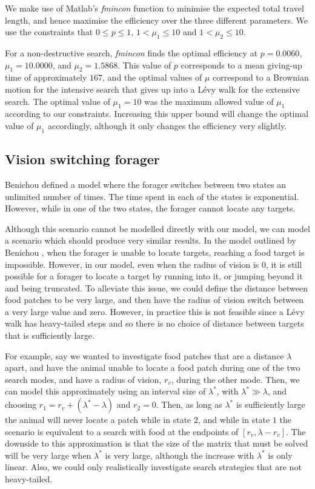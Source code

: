 We make use of Matlab's \emph{fmincon} function to minimise the expected total travel length, and hence maximise the efficiency over the three different parameters. We use the constraints that $0 \leq p \leq 1$, $1 < \mu_1 \leq 10$ and $1 < \mu_2 \leq 10$. 

For a non-destructive search, \emph{fmincon} finds the optimal efficiency at $p=0.0060$, $\mu_1 = 10.0000$, and $\mu_2 = 1.5868$. This value of $p$ corresponds to a mean giving-up time of approximately $167$, and the optimal values of $\mu$ correspond to a Brownian motion for the intensive search that gives up into a L\'{e}vy walk for the extensive search. The optimal value of $\mu_1 = 10$ was the maximum allowed value of $\mu_1$ according to our constraints. Increasing this upper bound will change the optimal value of $\mu_1$ accordingly, although it only changes the efficiency very slightly.

\subsection{Vision switching forager \label{sec:1dMMRW_VisionSwitching}}
Benichou \etal \cite{Benichou_2005} defined a model where the forager switches between two states an unlimited number of times. The time spent in each of the states is exponential. However, while in one of the two states, the forager cannot locate any targets.

Although this scenario cannot be modelled directly with our model, we can model a scenario which should produce very similar results. In the model outlined by Benichou \etal \cite{Benichou_2005}, when the forager is unable to locate targets, reaching a food target is impossible. However, in our model, even when the radius of vision is $0$, it is still possible for a forager to locate a target by running into it, or jumping beyond it and being truncated. To alleviate this issue, we could define the distance between food patches to be very large, and then have the radius of vision switch between a very large value and zero. However, in practice this is not feasible since a L\'{e}vy walk has heavy-tailed steps and so there is no choice of distance between targets that is sufficiently large.

For example, say we wanted to investigate food patches that are a distance $\lambda$ apart, and have the animal unable to locate a food patch during one of the two search modes, and have a radius of vision, $r_v$, during the other mode. Then, we can model this approximately using an interval size of $\lambda^*$, with $\lambda^* \gg \lambda$, and choosing $r_1 = r_v + (\lambda^* - \lambda)$ and $r_2 = 0$. Then, as long as $\lambda^*$ is sufficiently large the animal will never locate a patch while in state $2$, and while in state $1$ the scenario is equivalent to a search with food at the endpoints of $[r_v,\lambda-r_v]$. The downside to this approximation is that the size of the matrix that must be solved will be very large when $\lambda^*$ is very large, although the increase with $\lambda^*$ is only linear. Also, we could only realistically investigate search strategies that are not heavy-tailed.

